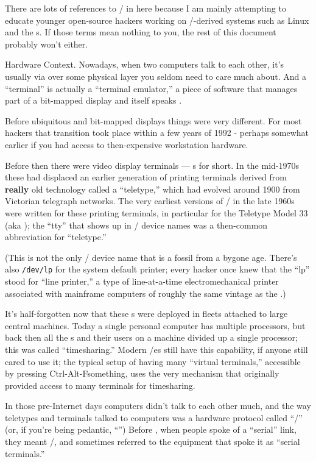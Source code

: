 There are lots of references to \UNIX/ in here because I am mainly attempting to
educate younger open-source hackers working on \UNIX/-derived systems such as
Linux and the s. If those terms mean nothing to you, the rest of this
document probably won't either.

\sect Hardware Context.
Nowadays, when two computers talk to each other, it's usually via  over
some physical layer you seldom need to care much about. And a ``terminal'' is
actually a ``terminal emulator,'' a piece of software that manages part of a
bit-mapped display and itself speaks .

Before ubiquitous  and bit-mapped displays things were very different.
For most hackers that transition took place within a few years of 1992 -
perhaps somewhat earlier if you had access to then-expensive workstation
hardware.

Before then there were video display terminals --- s for short. In the
mid-1970s these had displaced an earlier generation of printing terminals
derived from {\bf really} old technology called a ``teletype,'' which had evolved
around 1900 from Victorian telegraph networks. The very earliest versions of
\UNIX/ in the late 1960s were written for these printing terminals, in particular
for the Teletype Model 33 (aka ); the ``tty'' that shows up in \UNIX/ device
names was a then-common abbreviation for ``teletype.''

(This is not the only \UNIX/ device name that is a fossil from a bygone age.
There's also {\tt /dev/lp} for the system default printer; every hacker once knew
that the ``lp'' stood for ``line printer,'' a type of line-at-a-time
electromechanical printer associated with mainframe computers of roughly the
same vintage as the .)

It's half-forgotten now that these s were deployed in fleets attached to
large central machines. Today a single personal computer has multiple
processors, but back then all the s and their users on a machine divided up
a single processor; this was called ``timesharing.'' Modern \UNIX/es still have
this capability, if anyone still cared to use it; the typical setup of having
many ``virtual terminals,'' accessible by pressing Ctrl-Alt-Fsomething, uses the
very mechanism that originally provided access to many terminals for
timesharing.

In those pre-Internet days computers didn't talk to each other much, and the
way teletypes and terminals talked to computers was a hardware protocol called
``\RSTTT/'' (or, if you're being pedantic, ``'')  Before , when
people spoke of a ``serial'' link, they meant \RSTTT/, and sometimes referred to
the equipment that spoke it as ``serial terminals.''

